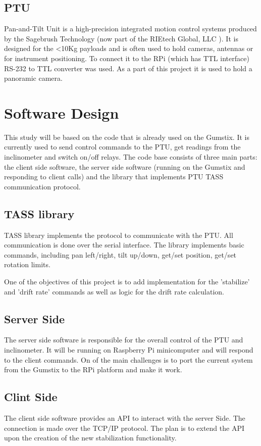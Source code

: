 \subsection{PTU}
Pan-and-Tilt Unit is a high-precision integrated motion control systems produced by the Sagebrush Technology (now part of the RIEtech Global, LLC \cite{RIEtech_Global}). It is designed for the <10Kg payloads and is often used to hold cameras, antennas or for instrument positioning. To connect it to the RPi (which has TTL interface) RS-232 to TTL converter was used. As a part of this project it is used to hold a panoramic camera. 

\section{Software Design}
This study will be based on the code that is already used on the Gumstix. It is currently used to send control commands to the PTU, get readings from the inclinometer and switch on/off relays. The code base consists of three main parts: the client side software, the server side software (running on the Gumstix and responding to client calls) and the library that implements PTU TASS communication protocol. 

\subsection{TASS library}
TASS library implements the protocol to communicate with the PTU. All communication is done over the serial interface.  The library implements basic commands, including pan left/right, tilt up/down, get/set position, get/set rotation limits.

One of the objectives of this project is to add implementation for the 'stabilize' and 'drift rate' commands as well as logic for the drift rate calculation.

\subsection{Server Side}
The server side software is responsible for the overall control of the PTU and inclinometer. It will be running on Raspberry Pi minicomputer and will respond to the client commands. On of the main challenges is to port the current system from the Gumstix to the RPi platform and make it work.

\subsection{Clint Side}
The client side software provides an API to interact with the server Side. The connection is made over the TCP/IP protocol. The plan is to extend the API upon the creation of the new stabilization functionality. 

